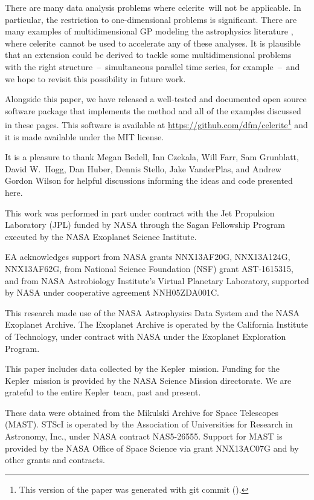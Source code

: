 \documentclass[manuscript, letterpaper]{aastex6}
\newcommand{\project}[1]{\textsf{#1}}
\newcommand{\kepler}{\project{Kepler}}
\newcommand{\celerite}{\project{celerite}}
\begin{document}
There are many data analysis problems where \celerite\ will not be applicable.
In particular, the restriction to one-dimensional problems is significant.
There are many examples of multidimensional GP modeling the astrophysics
literature \citep[recent examples from the field of exoplanet characterization
include][]{Haywood:2014, Rajpaul:2015, Aigrain:2016}, where \celerite\ cannot
be used to accelerate any of these analyses.
It is plausible that an extension could be derived to tackle some
multidimensional problems with the right structure~--~simultaneous parallel
time series, for example~--~and we hope to revisit this possibility in future
work.

Alongside this paper, we have released a well-tested and documented open
source software package that implements the method and all of the examples
discussed in these pages.
This software is available at \url{https://github.com/dfm/celerite}\footnote{%
This version of the paper was generated with git commit \texttt{\githash}
(\gitdate).} and it is made available under the MIT license.

\acknowledgments
It is a pleasure to thank
Megan Bedell,
Ian Czekala,
Will Farr,
Sam Grunblatt,
David W.\ Hogg,
Dan Huber,
Dennis Stello,
Jake VanderPlas, and
Andrew Gordon Wilson
for helpful discussions informing the ideas and code presented here.

This work was performed in part under contract with the Jet Propulsion
Laboratory (JPL) funded by NASA through the Sagan Fellowship Program executed
by the NASA Exoplanet Science Institute.

EA acknowledges support from NASA grants NNX13AF20G, NNX13A124G, NNX13AF62G,
from National Science Foundation (NSF) grant AST-1615315, and from
NASA Astrobiology Institute's Virtual Planetary Laboratory, supported
by NASA under cooperative agreement NNH05ZDA001C.

This research made use of the NASA \project{Astrophysics Data System} and the
NASA Exoplanet Archive.
The Exoplanet Archive is operated by the California Institute of Technology,
under contract with NASA under the Exoplanet Exploration Program.

This paper includes data collected by the \kepler\ mission. Funding for the
\kepler\ mission is provided by the NASA Science Mission directorate.
We are grateful to the entire \kepler\ team, past and present.

These data were obtained from the Mikulski Archive for Space Telescopes
(MAST).
STScI is operated by the Association of Universities for Research in
Astronomy, Inc., under NASA contract NAS5-26555.
Support for MAST is provided by the NASA Office of Space Science via grant
NNX13AC07G and by other grants and contracts.
\end{document}
